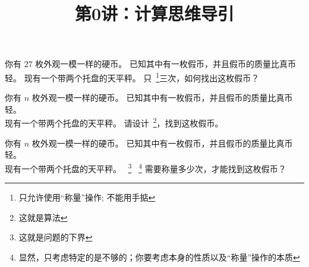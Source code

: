 \documentclass[a4paper, justified]{tufte-handout}
\title{第0讲：计算思维导引}
\date{\zhtoday} %
\begin{document}
\maketitle
\noplagiarism %
\begin{abstract}
  \begin{center}{}
  \end{center}
\end{abstract}
\beginrequired

\begin{problem}[$27$ 枚硬币]

  你有 $27$ 枚外观一模一样的硬币。
  已知其中有一枚假币，并且假币的质量比真币轻。
  现有一个带两个托盘的天平秤。
  只~\footnote{只允许使用``称量''操作; 不能用手掂}三次，如何找出这枚假币？
\end{problem}

\begin{solution}
\end{solution}

\begin{problem}[$n$ 枚硬币]
  你有 $n$ 枚外观一模一样的硬币。
  已知其中有一枚假币，并且假币的质量比真币轻。\\
  现有一个带两个托盘的天平秤。
  请设计~\footnote{这就是算法}，找到这枚假币。
\end{problem}

\begin{solution}
\end{solution}

\begin{problem}[$n$ 枚硬币问题的下界]
  你有 $n$ 枚外观一模一样的硬币。
  已知其中有一枚假币，并且假币的质量比真币轻。\\
  现有一个带两个托盘的天平秤。
  ~\footnote{这就是问题的下界}
  ~\footnote{显然，只考虑特定的是不够的；你要考虑本身的性质以及``称量''操作的本质}
  需要称量多少次，才能找到这枚假币？
\end{problem}
\end{document}
